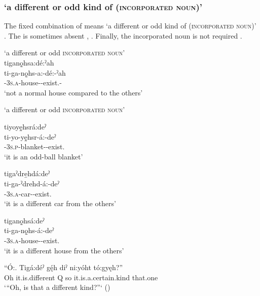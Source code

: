\subsubsection*{ ‘a different or odd kind of (\textsc{incorporated noun})’} \label{[ti-(incorporated noun)-deˀ(ah)]}
The fixed combination of  means ‘a different or odd kind of (\textsc{incorporated noun})’ . The  \textsc{\diminutive} is sometimes absent , . Finally, the incorporated noun is not required .

\ea\label{ex:pppexpressionex19}  ‘a different or odd \textsc{incorporated noun}’\\
tiganǫ̱hsa:dé:ˀah\\\label{ex:pppexpressionex19a}
\gll ti-ga-nǫ̱hs-a:-dé:-ˀah\\
{\contrastive}-\textsc{3s.a}-house-{\joinerA}-exist.{\stative}-{\diminutive}\\
\glt `not a normal house compared to the others'
\z


\ea\label{ex:pppexpressionex18}  ‘a different or odd \textsc{incorporated noun}’

\ea tiyoyę̱hsrá:deˀ\\
\gll ti-yo-yę̱hsr-á:-deˀ\\
{\contrastive}-\textsc{3s.p}-blanket-{\joinerA}-exist.{\stative}\\
\glt `it is an odd-ball blanket'

\ex tigaˀdre̱hdá:deˀ\\
\gll ti-ga-ˀdrehd-á:-deˀ\\
{\contrastive}-\textsc{3s.a}-car-{\joinerA}-exist.{\stative}\\
\glt `it is a different car from the others'

\ex tiganǫ̱hsá:deˀ\\
\gll ti-ga-nǫ̱hs-á:-deˀ\\
{\contrastive}-\textsc{3s.a}-house-{\joinerA}-exist.{\stative}\\
\glt `it is a different house from the others'
\z
\z

\ea\label{ex:pppexpressionex15}
\gll “Ó:. Tigá:déˀ gę́h diˀ ni:yóht tó:gyęh?” \\
Oh it.is.different Q so it.is.a.certain.kind that.one\\
\glt ‘“Oh, is that a different kind?”‘ (\cite{henry_de_2005})
\z

